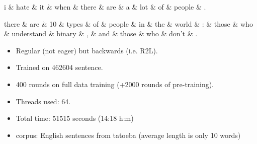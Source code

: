 \documentclass[12pt]{extarticle}
\begin{document}
\begin{dependency}[theme = simple]
\begin{deptext}[column sep=1em]
     i \& hate \& it \& when \& there \& are \& a \& lot \& of \& people \& .  \\
\end{deptext}
\end{dependency}

\scriptsize
\begin{dependency}[theme = simple]
\begin{deptext}[column sep=1em]
     there \& are \& 10 \& types \& of \& people \& in \& the \& world \& : \& those \& who \& understand \& binary \& , \& and \& those \& who \& don't \& .  \\
\end{deptext}
\end{dependency}

\vfill
\begin{center}
\begin{minipage}{5in}
\begin{itemize}
\item Regular (not eager) but backwards (i.e. R2L).
\item Trained on 462604 sentence.    
\item 400 rounds on full data training (+2000 rounds of pre-training).
\item Threads used: 64.
\item Total time: 51515 seconds  (14:18 h:m)
\item corpus: English sentences from tatoeba (average length is only
10 words)
\end{itemize}
\end{minipage}
\end{center}
\end{document}
